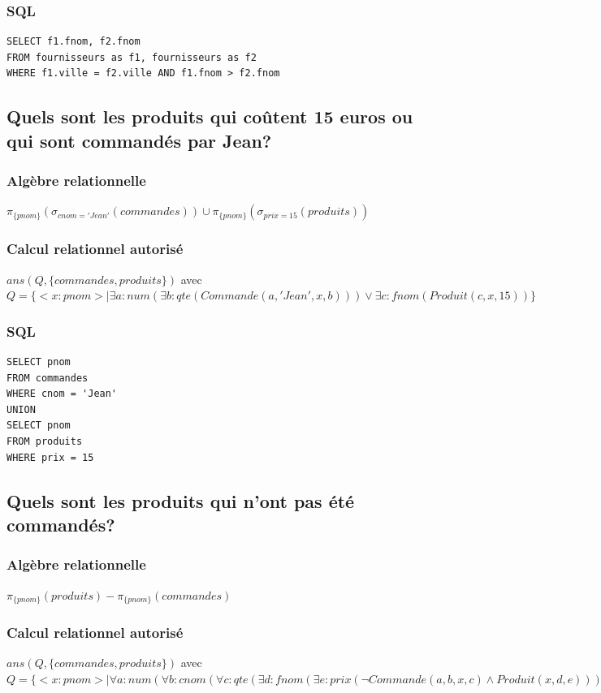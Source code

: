 \documentclass[10pt,a4paper,twoside]{article}
\begin{document}
\subsubsection{SQL}
\begin{verbatim}
SELECT f1.fnom, f2.fnom
FROM fournisseurs as f1, fournisseurs as f2
WHERE f1.ville = f2.ville AND f1.fnom > f2.fnom
\end{verbatim}

\subsection{Quels sont les produits qui coûtent 15 euros ou qui sont commandés par Jean?}
\subsubsection{Algèbre relationnelle}
$\pi_{\{pnom\}}(\sigma_{cnom = 'Jean'}(commandes)) \cup \pi_{\{pnom\}}(\sigma_{prix=15}(produits))$
\subsubsection{Calcul relationnel autorisé}
$ans(Q,\{commandes, produits\})$ avec $Q=\{<x:pnom> \mid \exists a:num(\exists b:qte(Commande(a,'Jean',x,b))) \vee \exists c:fnom(Produit(c,x,15))\}$
\subsubsection{SQL}
\begin{verbatim}
SELECT pnom
FROM commandes
WHERE cnom = 'Jean'
UNION
SELECT pnom
FROM produits
WHERE prix = 15
\end{verbatim}

\subsection{Quels sont les produits qui n'ont pas été commandés?}
\subsubsection{Algèbre relationnelle}
$\pi_{\{pnom\}}(produits)-\pi_{\{pnom\}}(commandes) $
\subsubsection{Calcul relationnel autorisé}
$ans(Q,\{commandes, produits\})$ avec $Q=\{<x:pnom> \mid \forall a:num(\forall b:cnom(\forall c:qte(\exists d:fnom(\exists e:prix(\neg Commande(a,b,x,c) \wedge Produit(x,d,e)))))) \}$
\end{document}
